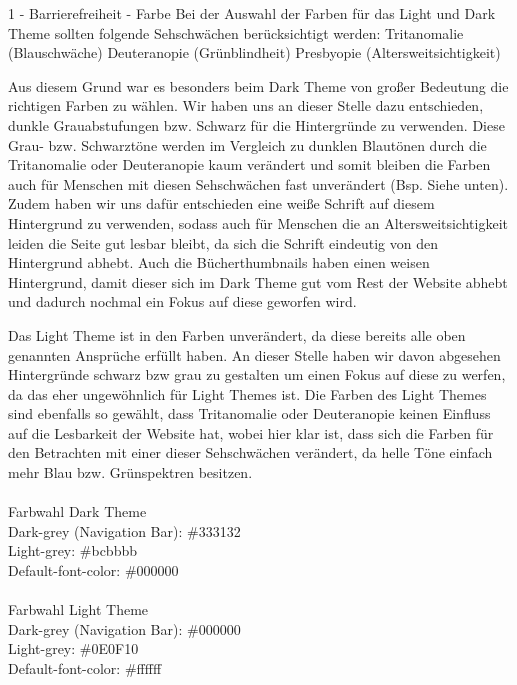 \documentclass[a4paper]{article}
\begin{document}
\begin{exercise}{1 - Barrierefreiheit - Farbe} 
Bei der Auswahl der Farben für das Light und Dark Theme sollten folgende Sehschwächen berücksichtigt werden:
Tritanomalie (Blauschwäche)
Deuteranopie (Grünblindheit)
Presbyopie (Altersweitsichtigkeit)

Aus diesem Grund war es besonders beim Dark Theme von großer Bedeutung die richtigen Farben zu wählen. 
Wir haben uns an dieser Stelle dazu entschieden, dunkle Grauabstufungen bzw. Schwarz für die Hintergründe zu verwenden. Diese Grau- bzw. Schwarztöne werden im Vergleich zu dunklen Blautönen durch die Tritanomalie oder Deuteranopie kaum verändert und somit bleiben die Farben auch für Menschen mit diesen Sehschwächen fast unverändert (Bsp. Siehe unten). Zudem haben wir uns dafür entschieden eine weiße Schrift auf diesem Hintergrund zu verwenden, sodass auch für Menschen die an Altersweitsichtigkeit leiden die Seite gut lesbar bleibt, da sich die Schrift eindeutig von den Hintergrund abhebt. Auch die Bücherthumbnails haben einen weisen Hintergrund, damit dieser sich im Dark Theme gut vom Rest der Website abhebt und dadurch nochmal ein Fokus auf diese geworfen wird.

Das Light Theme ist in den Farben unverändert, da diese bereits alle oben genannten Ansprüche erfüllt haben. An dieser Stelle haben wir davon abgesehen Hintergründe schwarz bzw grau zu gestalten um einen Fokus auf diese zu werfen, da das eher ungewöhnlich für Light Themes ist.
Die Farben des Light Themes sind ebenfalls so gewählt, dass Tritanomalie oder Deuteranopie keinen Einfluss auf die Lesbarkeit der Website hat, wobei hier klar ist, dass sich die Farben für den Betrachten mit einer dieser Sehschwächen verändert, da helle Töne einfach mehr Blau bzw. Grünspektren besitzen.\\\\
Farbwahl Dark Theme\\
Dark-grey (Navigation Bar): \#333132\\
Light-grey: \#bcbbbb\\
Default-font-color: \#000000 \\\\
Farbwahl Light Theme\\
Dark-grey (Navigation Bar): \#000000 \\
Light-grey: \#0E0F10\\
Default-font-color: \#ffffff\\\\


\end{exercise}
\end{document}
